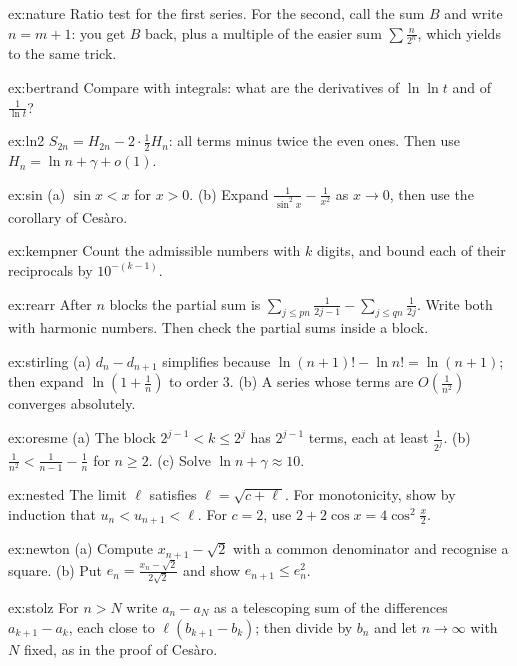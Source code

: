 \begin{hint}{ex:nature}
Ratio test for the first series. For the second, call the sum $B$ and write $n=m+1$: you get $B$ back, plus a multiple of the easier sum $\sum\frac n{2^n}$, which yields to the same trick.
\end{hint}
\begin{hint}{ex:bertrand}
Compare with integrals: what are the derivatives of $\ln\ln t$ and of $\frac1{\ln t}$?
\end{hint}
\begin{hint}{ex:ln2}
$S_{2n}=H_{2n}-2\cdot\frac12H_n$: all terms minus twice the even ones. Then use $H_n=\ln n+\gamma+o(1)$.
\end{hint}
\begin{hint}{ex:sin}
(a) $\sin x<x$ for $x>0$. (b) Expand $\frac1{\sin^2x}-\frac1{x^2}$ as $x\to0$, then use the corollary of Ces\`aro.
\end{hint}
\begin{hint}{ex:kempner}
Count the admissible numbers with $k$ digits, and bound each of their reciprocals by $10^{-(k-1)}$.
\end{hint}
\begin{hint}{ex:rearr}
After $n$ blocks the partial sum is $\sum_{j\le pn}\frac1{2j-1}-\sum_{j\le qn}\frac1{2j}$. Write both with harmonic numbers. Then check the partial sums inside a block.
\end{hint}
\begin{hint}{ex:stirling}
(a) $d_n-d_{n+1}$ simplifies because $\ln(n+1)!-\ln n!=\ln(n+1)$; then expand $\ln\left(1+\frac1n\right)$ to order $3$. (b) A series whose terms are $O\left(\frac1{n^2}\right)$ converges absolutely.
\end{hint}
\begin{hint}{ex:oresme}
(a) The block $2^{j-1}<k\le2^j$ has $2^{j-1}$ terms, each at least $\frac1{2^j}$. (b) $\frac1{n^2}<\frac1{n-1}-\frac1n$ for $n\ge2$. (c) Solve $\ln n+\gamma\approx10$.
\end{hint}
\begin{hint}{ex:nested}
The limit $\ell$ satisfies $\ell=\sqrt{c+\ell}$. For monotonicity, show by induction that $u_n<u_{n+1}<\ell$. For $c=2$, use $2+2\cos x=4\cos^2\frac x2$.
\end{hint}
\begin{hint}{ex:newton}
(a) Compute $x_{n+1}-\sqrt2$ with a common denominator and recognise a square. (b) Put $e_n=\frac{x_n-\sqrt2}{2\sqrt2}$ and show $e_{n+1}\le e_n^2$.
\end{hint}
\begin{hint}{ex:stolz}
For $n>N$ write $a_n-a_N$ as a telescoping sum of the differences $a_{k+1}-a_k$, each close to $\ell(b_{k+1}-b_k)$; then divide by $b_n$ and let $n\to\infty$ with $N$ fixed, as in the proof of Ces\`aro.
\end{hint}
